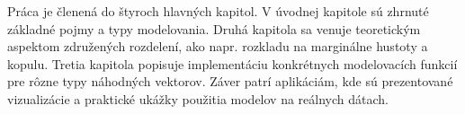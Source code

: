 Práca je členená do štyroch hlavných kapitol. V úvodnej kapitole sú zhrnuté základné pojmy a typy modelovania. Druhá kapitola sa venuje teoretickým aspektom združených rozdelení, ako napr. rozkladu na marginálne hustoty a kopulu. Tretia kapitola popisuje implementáciu konkrétnych modelovacích funkcií pre rôzne typy náhodných vektorov. Záver patrí aplikáciám, kde sú prezentované vizualizácie a praktické ukážky použitia modelov na reálnych dátach.